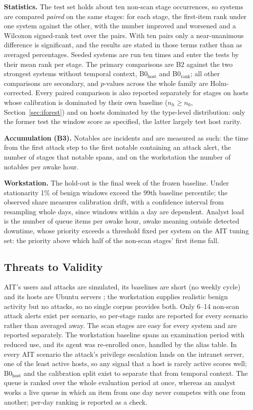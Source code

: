 \documentclass[conference]{IEEEtran}
\begin{document}
\textbf{Statistics.} The test set holds about ten non-scan stage occurrences, so systems are compared \emph{paired} on the same stages: for each stage, the first-item rank under one system against the other, with the number improved and worsened and a Wilcoxon signed-rank test over the pairs. With ten pairs only a near-unanimous difference is significant, and the results are stated in those terms rather than as averaged percentages. Seeded systems are run ten times and enter the tests by their mean rank per stage. The primary comparisons are B2 against the two strongest systems without temporal context, B0$_\mathrm{host}$ and B0$_\mathrm{rank}$; all other comparisons are secondary, and $p$-values across the whole family are Holm-corrected. Every paired comparison is also reported separately for stages on hosts whose calibration is dominated by their own baseline ($n_h \ge n_0$, Section~\ref{sec:iforest}) and on hosts dominated by the type-level distribution: only the former test the window score as specified, the latter largely test host rarity.

\textbf{Accumulation (B3).} Notables are incidents and are measured as such: the time from the first attack step to the first notable containing an attack alert, the number of stages that notable spans, and on the workstation the number of notables per awake hour.

\textbf{Workstation.} The hold-out is the final week of the frozen baseline. Under stationarity 1\% of benign windows exceed the 99th baseline percentile; the observed share measures calibration drift, with a confidence interval from resampling whole days, since windows within a day are dependent. Analyst load is the number of queue items per awake hour, awake meaning outside detected downtime, whose priority exceeds a threshold fixed per system on the AIT tuning set: the priority above which half of the non-scan stages' first items fall.

\subsection{Threats to Validity}
\label{sec:threats}

AIT's users and attacks are simulated, its baselines are short (no weekly cycle) and its hosts are Ubuntu servers \cite{ref22}; the workstation supplies realistic benign activity but no attacks, so no single corpus provides both. Only 6--14 non-scan attack alerts exist per scenario, so per-stage ranks are reported for every scenario rather than averaged away. The scan stages are easy for every system and are reported separately. The workstation baseline spans an examination period with reduced use, and its agent was re-enrolled once, handled by the alias table. In every AIT scenario the attack's privilege escalation lands on the intranet server, one of the least active hosts, so any signal that a host is rarely active scores well; B0$_\mathrm{host}$ and the calibration split exist to separate that from temporal context. The queue is ranked over the whole evaluation period at once, whereas an analyst works a live queue in which an item from one day never competes with one from another; per-day ranking is reported as a check.
\end{document}
